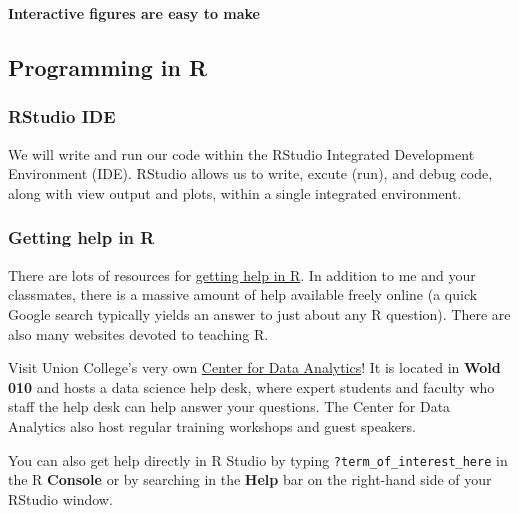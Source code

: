 \documentclass[
]{article}
\begin{document}
~

\hypertarget{interactive-figures-are-easy-to-make}{%
\paragraph{\texorpdfstring{\textbf{Interactive figures are easy to
make}}{Interactive figures are easy to make}}\label{interactive-figures-are-easy-to-make}}

\hypertarget{programming-in-r}{%
\subsection{Programming in R}\label{programming-in-r}}

\hypertarget{rstudio-ide}{%
\subsubsection{RStudio IDE}\label{rstudio-ide}}

We will write and run our code within the RStudio Integrated Development
Environment (IDE). RStudio allows us to write, excute (run), and debug
code, along with view output and plots, within a single integrated
environment.

\hypertarget{getting-help-in-r}{%
\subsubsection{Getting help in R}\label{getting-help-in-r}}

There are lots of resources for
\href{https://stahlm.github.io/ENS_215/Winter_2025/Syllabus.html\#useful_linksresources}{getting
help in R}. In addition to me and your classmates, there is a massive
amount of help available freely online (a quick Google search typically
yields an answer to just about any R question). There are also many
websites devoted to teaching R.

Visit Union College's very own \href{https://muse.union.edu/cda/}{Center
for Data Analytics}! It is located in \textbf{Wold 010} and hosts a data
science help desk, where expert students and faculty who staff the help
desk can help answer your questions. The Center for Data Analytics also
host regular training workshops and guest speakers.

You can also get help directly in R Studio by typing
\texttt{?term\_of\_interest\_here} in the R \textbf{Console} or by
searching in the \textbf{Help} bar on the right-hand side of your
RStudio window.
\end{document}

